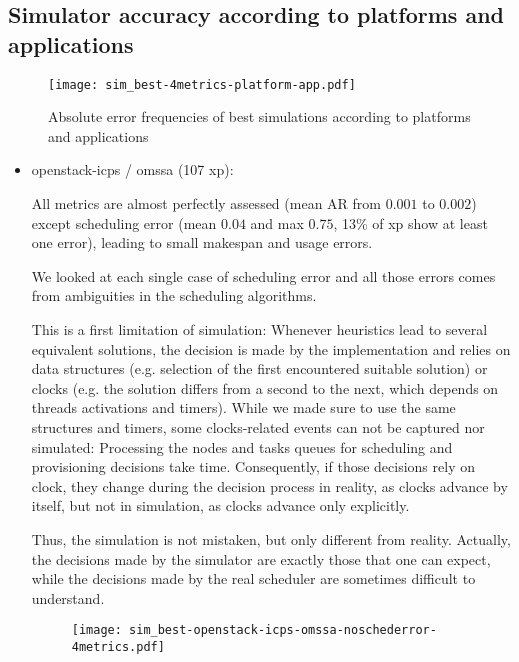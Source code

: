 \documentclass[parallelisme]{compas2017}
\newcommand\vrpath{../../lab/setup/simschlouder/validation-results/}
\begin{document}
\subsection{Simulator accuracy according to platforms and applications}


\begin{figure}
  \texttt{[image: sim\_best-4metrics-platform-app.pdf]}
\caption{Absolute error frequencies of best simulations according to platforms 
and applications}
\end{figure} 

\begin{itemize}
 \item openstack-icps / omssa (107 xp): 
 
      
 
      All metrics are almost perfectly assessed (mean AR from $0.001$ to $0.002$)
      except scheduling error 
      (mean $0.04$ and max $0.75$, 13\% of xp show at least one error), 
      leading to small makespan and usage errors. 
      
      We looked at each single case of scheduling error and all those errors 
      comes from ambiguities in the scheduling algorithms.
      
      This is a first limitation of simulation:
      Whenever heuristics lead to several equivalent solutions, 
      the decision is made by the implementation and relies on data structures 
      (e.g. selection of the first encountered suitable solution) or clocks 
      (e.g. the solution differs from a second to the next, which depends 
      on threads activations and timers). While we made sure to use the same 
      structures and timers, some clocks-related events can not be captured nor 
      simulated: Processing the nodes and tasks queues for scheduling and 
      provisioning decisions take time. Consequently, if those decisions rely on
      clock, they change during the decision process in reality, as clocks advance 
      by itself, but not in simulation, as clocks advance only explicitly.
      
      Thus, the simulation is not mistaken, but only different from reality.
      Actually, the decisions made by the simulator are exactly those that one 
      can expect, while the decisions made by the real scheduler are sometimes
      difficult to understand.

      
\begin{figure}  
  \texttt{[image: sim\_best-openstack-icps-omssa-noschederror-4metrics.pdf]}


\end{figure}
\end{itemize}
\end{document}
